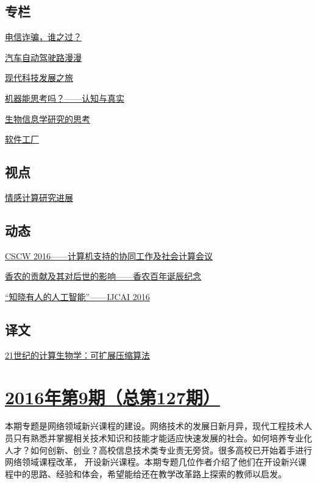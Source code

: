\documentclass[a4paper]{article}
\begin{document}
\subsection{专栏}
\href{http://history.ccf.org.cn/resources/1190201776262/2016/10/14/Yocsef.pdf}{电信诈骗，谁之过？}

\href{http://history.ccf.org.cn/resources/1190201776262/2016/10/14/xulingyu.pdf}{汽车自动驾驶路漫漫}

\href{http://history.ccf.org.cn/resources/1190201776262/2016/10/14/baohaifei.pdf}{现代科技发展之旅}

\href{http://history.ccf.org.cn/resources/1190201776262/2016/10/14/yingxingren.pdf}{机器能思考吗？——认知与真实}

\href{http://history.ccf.org.cn/resources/1190201776262/2016/10/14/liuqi.pdf}{生物信息学研究的思考}

\href{http://history.ccf.org.cn/resources/1190201776262/2016/10/14/David.pdf}{软件工厂}

\subsection{视点}
\href{http://history.ccf.org.cn/resources/1190201776262/2016/10/14/taojianhua.pdf}{情感计算研究进展}

\subsection{动态}
\href{http://history.ccf.org.cn/resources/1190201776262/2016/10/14/huangwenjian.pdf}{CSCW 2016——计算机支持的协同工作及社会计算会议}

\href{http://history.ccf.org.cn/resources/1190201776262/2016/10/14/zhangweiguo.pdf}{香农的贡献及其对后世的影响——香农百年诞辰纪念}

\href{http://history.ccf.org.cn/resources/1190201776262/2016/10/14/qianhong.pdf}{“知晓有人的人工智能”——IJCAI 2016}

\subsection{译文}
\href{http://history.ccf.org.cn/resources/1190201776262/2016/10/14/yiwen.pdf}{21世纪的计算生物学：可扩展压缩算法}


\section{\href{http://history.ccf.org.cn/sites/ccf/jsjtbbd.jsp?contentId=2947259303272}{\textbf{2016年第9期（总第127期）}}}
本期专题是网络领域新兴课程的建设。网络技术的发展日新月异，现代工程技术人员只有熟悉并掌握相关技术知识和技能才能适应快速发展的社会。如何培养专业化人才？如何创新、创业？高校信息技术类专业责无旁贷。很多高校已开始着手进行网络领域课程改革， 开设新兴课程。本期专题几位作者介绍了他们在开设新兴课程中的思路、经验和体会，希望能给还在教学改革路上探索的教师以启发。
\end{document}
